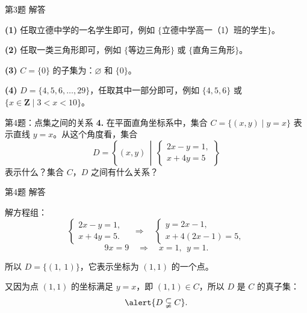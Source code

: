 \documentclass[10pt,aspectratio=169,serif]{beamer}
\begin{document}
\begin{frame}[t]{第3题 解答}
\begin{tcolorbox}[colback=orange!10,colframe=orange,title=\textbf{参考答案（不唯一）}]
\textbf{(1)} 任取立德中学的一名学生即可，例如 $\{$立德中学高一（1）班的学生$\}$。

\vspace{0.5em}
\textbf{(2)} 任取一类三角形即可，例如 $\{$等边三角形$\}$ 或 $\{$直角三角形$\}$。

\vspace{0.5em}
\textbf{(3)} $C = \{0\}$ 的子集为：$\varnothing$ 和 $\{0\}$。

\vspace{0.5em}
\textbf{(4)} $D = \{4, 5, 6, \dots, 29\}$，任取其中一部分即可，例如 $\{4, 5, 6\}$ 或 $\{x \in \mathbf{Z} \mid 3 < x < 10\}$。
\end{tcolorbox}
\end{frame}

\begin{frame}[t]{第4题：点集之间的关系}
\textbf{4.} 在平面直角坐标系中，集合 $C = \{(x,y) \mid y = x\}$ 表示直线 $y = x$。从这个角度看，集合
\[
D = \left\{(x,y) \,\middle|\, \begin{cases} 2x - y = 1,\\ x + 4y = 5 \end{cases}\right\}
\]
表示什么？集合 $C$，$D$ 之间有什么关系？
\end{frame}

\begin{frame}[t]{第4题 解答}
\begin{tcolorbox}[colback=orange!10,colframe=orange,title=\textbf{解}]
解方程组：
\[
\begin{cases}
2x - y = 1,\\
x + 4y = 5.
\end{cases}
\quad\Rightarrow\quad
\begin{cases}
y = 2x - 1,\\
x + 4(2x - 1) = 5,
\end{cases}
\]
\[
9x = 9 \quad\Rightarrow\quad x = 1,\ \ y = 1.
\]

所以 $D = \{(1,\ 1)\}$，它表示坐标为 $(1,1)$ 的一个点。

\vspace{0.5em}
又因为点 $(1,1)$ 的坐标满足 $y = x$，即 $(1,1) \in C$，所以 $D$ 是 $C$ 的真子集：
\[
\alert{D \subsetneqq C}.
\]
\end{tcolorbox}
\end{frame}
\end{document}
